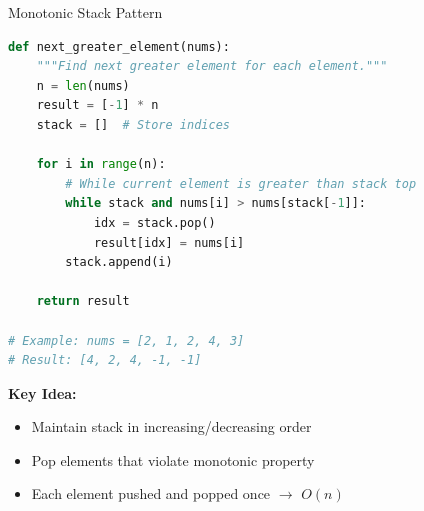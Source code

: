 \documentclass[aspectratio=169,xcolor=dvipsnames]{beamer}
\begin{document}
\begin{frame}[fragile]{Monotonic Stack Pattern}
\begin{lstlisting}[language=Python, basicstyle=\tiny\ttfamily]
def next_greater_element(nums):
    """Find next greater element for each element."""
    n = len(nums)
    result = [-1] * n
    stack = []  # Store indices

    for i in range(n):
        # While current element is greater than stack top
        while stack and nums[i] > nums[stack[-1]]:
            idx = stack.pop()
            result[idx] = nums[i]
        stack.append(i)

    return result

# Example: nums = [2, 1, 2, 4, 3]
# Result: [4, 2, 4, -1, -1]
\end{lstlisting}

\vspace{0.2cm}
\textbf{Key Idea:}
\begin{itemize}
  \item Maintain stack in increasing/decreasing order
  \item Pop elements that violate monotonic property
  \item Each element pushed and popped once $\to$ $O(n)$
\end{itemize}
\end{frame}
\end{document}
